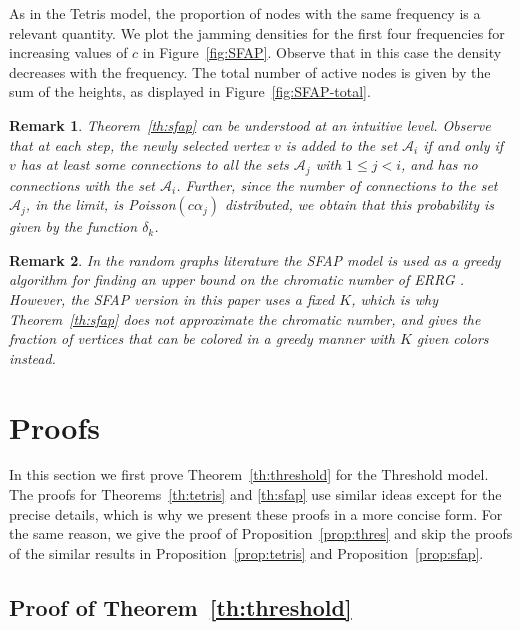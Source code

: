 \documentclass[11pt,a4paper, reqno]{article}
\newtheorem{remark}{Remark}
\begin{document}
As in the Tetris model, the proportion of nodes with the same frequency is a relevant quantity.
 We plot the jamming densities for the first four frequencies for increasing values of $c$ in Figure~\ref{fig:SFAP}. Observe that in this case the density decreases with the frequency.
  The total number of active nodes is given by the sum of the heights, as displayed in Figure~\ref{fig:SFAP-total}.

\begin{remark}
\normalfont
 Theorem~\ref{th:sfap} can be understood at an intuitive level. Observe that at each step, the newly selected vertex $v$ is added to the set $\mathcal{A}_i$ if and only if $v$ has at least some connections to all the sets $\mathcal{A}_j$ with $1\leq j<i$, and has no connections with the set $\mathcal{A}_i$. Further, since the number of connections to the set $\mathcal{A}_j$, in the limit, is Poisson$(c\alpha_j)$ distributed, we obtain that this probability is given by the function $\delta_k$.
\end{remark}
\begin{remark} \normalfont In the random graphs literature the SFAP model is used as a greedy algorithm for finding an upper bound on the chromatic number of ERRG \cite{M84,PW97}. However, the SFAP version in this paper uses a fixed $K$, which is why Theorem~\ref{th:sfap} does not approximate the chromatic number, and gives the fraction of vertices that can be colored in a greedy manner with $K$ given colors instead. 
\end{remark}

\section{Proofs}\label{sec:proofs}
In this section we first prove Theorem~\ref{th:threshold} for the Threshold model. The proofs for Theorems~\ref{th:tetris} and \ref{th:sfap} use similar ideas except for the precise details, which is why we present these proofs in a more concise form. For the same reason, we give the proof of Proposition~\ref{prop:thres} and skip the proofs of the similar results in Proposition~\ref{prop:tetris} and Proposition~\ref{prop:sfap}.

\subsection{Proof of Theorem~\ref{th:threshold}}
\end{document}
